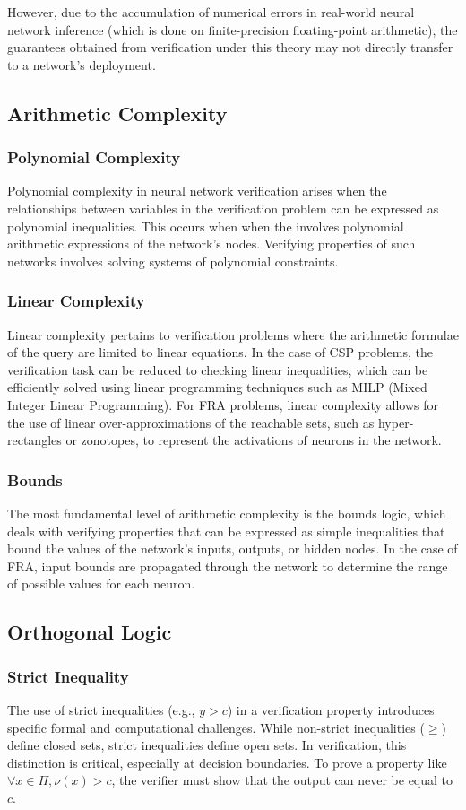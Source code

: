 However, due to the accumulation of numerical errors in real-world neural network inference (which is done on finite-precision floating-point arithmetic), 
the guarantees obtained from verification under this theory may not directly transfer to a network's deployment. 

\subsection{Arithmetic Complexity}

\subsubsection*{Polynomial Complexity}
Polynomial complexity in neural network verification arises when the relationships between variables in the verification problem can be expressed as polynomial inequalities. 
This occurs when when the \vnnlib{} involves polynomial arithmetic expressions of the network's nodes. Verifying properties of such networks involves solving systems of polynomial constraints.

\subsubsection*{Linear Complexity}
Linear complexity pertains to verification problems where the arithmetic formulae of the query are limited to linear equations. In the case of CSP problems, the verification task can be reduced 
to checking linear inequalities, which can be efficiently solved using linear programming techniques such as MILP (Mixed Integer Linear Programming). For FRA problems, linear complexity allows 
for the use of linear over-approximations of the reachable sets, such as hyper-rectangles or zonotopes, to represent the activations of neurons in the network.

\subsubsection*{Bounds}
The most fundamental level of arithmetic complexity is the bounds logic, which deals with verifying properties that can be expressed as simple inequalities that bound the values of the network's 
inputs, outputs, or hidden nodes. In the case of FRA, input bounds are propagated through the network to determine the range of possible values for each neuron.

\subsection{Orthogonal Logic}

\subsubsection*{Strict Inequality}
The use of strict inequalities (e.g., $y > c$) in a verification property introduces specific formal and computational challenges. While non-strict inequalities ($\ge$) define closed sets, 
strict inequalities define open sets. In verification, this distinction is critical, especially at decision boundaries. To prove a property like $\forall x \in \Pi, \nu(x) > c$, the verifier 
must show that the output can never be equal to $c$.
